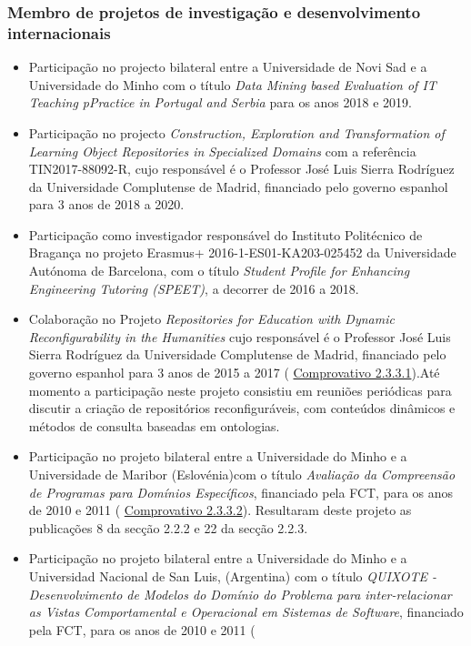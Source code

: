 \documentclass[11pt]{article}
\begin{document}
\subsubsection{Membro de projetos de investigação e desenvolvimento internacionais}
\begin{itemize}
\item{Participação no projecto bilateral entre a Universidade de Novi Sad e a Universidade do Minho com o título {
\em{ Data Mining based Evaluation of IT Teaching pPractice in Portugal and Serbia}} para os anos 2018 e 2019.}
\item{Participação no projecto {
\em{ Construction, Exploration and Transformation of Learning Object Repositories in Specialized Domains}} com a referência TIN2017-88092-R, cujo responsável é o Professor José Luis Sierra Rodríguez da Universidade Complutense de Madrid, financiado pelo governo espanhol para 3 anos de 2018 a 2020. }
\item{Participação como investigador responsável do Instituto Politécnico de Bragança no projeto Erasmus+ 2016-1-ES01-KA203-025452 da Universidade Autónoma de Barcelona, com o título {
\em{ Student Profile for Enhancing Engineering Tutoring (SPEET)}}, a decorrer de 2016 a 2018.}
\item{Colaboração no Projeto {
\em{ Repositories for Education with Dynamic Reconfigurability in the Humanities}} cujo responsável é o Professor José Luis Sierra Rodríguez da Universidade Complutense de Madrid, financiado pelo governo espanhol para 3 anos de 2015 a 2017 (
\href{run:Projectos/Memoria.pdf}{Comprovativo 2.3.3.1}).Até momento a participação neste projeto consistiu em reuniões periódicas para discutir a criação de repositórios reconfiguráveis, com conteúdos dinâmicos e métodos de consulta baseadas em ontologias.}
\item{Participação no projeto bilateral entre a Universidade do Minho e a Universidade de Maribor (Eslovénia)com o título {
\em{ Avaliação da Compreensão de Programas para Domínios Específicos}}, financiado pela FCT, para os anos de 2010 e 2011 (
\href{run:Projectos/eslov20102011.pdf}{Comprovativo 2.3.3.2}). Resultaram deste projeto as publicações 8 da secção 2.2.2 e 22 da secção 2.2.3.}
\item{Participação no projeto bilateral entre a Universidade do Minho e a Universidad Nacional de San Luis, (Argentina) com o título {
\em{ QUIXOTE - Desenvolvimento de Modelos do Domínio do Problema para inter-relacionar as Vistas Comportamental e Operacional em Sistemas de Software}}, financiado pela FCT, para os anos de 2010 e 2011 (
}
\end{itemize}
\end{document}
